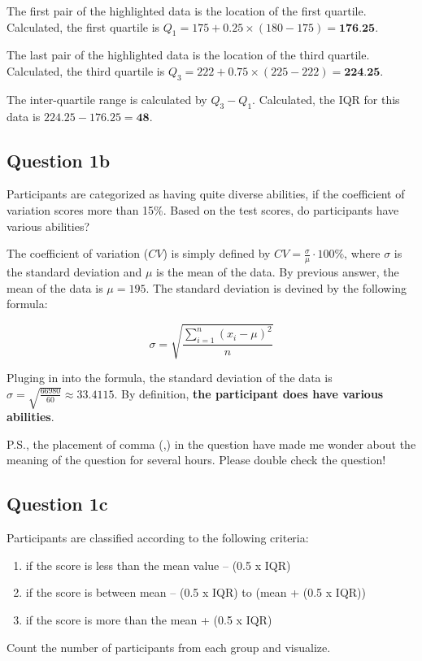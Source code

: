 \documentclass[
  11pt, %
]{assignment}
\begin{document}
\medskip

The first pair of the highlighted data is the location of the first quartile. Calculated, the first quartile is \(Q_1 = 175 + 0.25 \times (180 - 175) = \textbf{176.25}\).

The last pair of the highlighted data is the location of the third quartile. Calculated, the third quartile is \(Q_3 = 222 + 0.75 \times (225 - 222) = \textbf{224.25}\).

The inter-quartile range is calculated by \(Q_3 - Q_1\). Calculated, the IQR for this data is \(224.25 - 176.25 = \textbf{48}\).

\subsection*{Question 1b}

\begin{problem}
Participants are categorized as having quite diverse abilities, if the coefficient of variation scores more than 15\%. Based on the test scores, do participants have various abilities?
\end{problem}

The coefficient of variation (\(CV\)) is simply defined by \( CV = \frac{\sigma}{\mu} \cdot 100\% \), where \( \sigma \) is the standard deviation and \( \mu \) is the mean of the data. By previous answer, the mean of the data is \( \mu = 195 \). The standard deviation is devined by the following formula:

\begin{equation}
  \sigma = \sqrt{\frac{\sum_{i=1}^{n} {(x_i - \mu)}^2}{n}}
\end{equation}

Pluging in into the formula, the standard deviation of the data is \( \sigma = \sqrt{\frac{66980}{60}} \approx 33.4115 \). By definition, \textbf{the participant does have various abilities}.

\bigskip

P.S., the placement of comma (,) in the question have made me wonder about the meaning of the question for several hours. Please double check the question!

\subsection*{Question 1c}

\begin{problem}
Participants are classified according to the following criteria:
\begin{enumerate}[Group I:]
  \item if the score is less than the mean value – (0.5 x IQR)
  \item if the score is between mean – (0.5 x IQR) to (mean + (0.5 x IQR))
  \item if the score is more than the mean + (0.5 x IQR)
\end{enumerate}
Count the number of participants from each group and visualize.
\end{problem}
\end{document}
